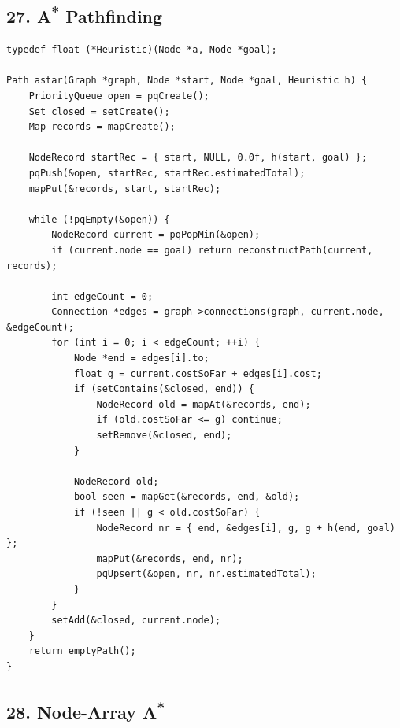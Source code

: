 \documentclass[10pt,letterpaper]{article}
\begin{document}
\subsection*{27. \texorpdfstring{A\textsuperscript{*}}{A*} Pathfinding}
{}

\begin{verbatim}
typedef float (*Heuristic)(Node *a, Node *goal);

Path astar(Graph *graph, Node *start, Node *goal, Heuristic h) {
    PriorityQueue open = pqCreate();
    Set closed = setCreate();
    Map records = mapCreate();

    NodeRecord startRec = { start, NULL, 0.0f, h(start, goal) };
    pqPush(&open, startRec, startRec.estimatedTotal);
    mapPut(&records, start, startRec);

    while (!pqEmpty(&open)) {
        NodeRecord current = pqPopMin(&open);
        if (current.node == goal) return reconstructPath(current, records);

        int edgeCount = 0;
        Connection *edges = graph->connections(graph, current.node, &edgeCount);
        for (int i = 0; i < edgeCount; ++i) {
            Node *end = edges[i].to;
            float g = current.costSoFar + edges[i].cost;
            if (setContains(&closed, end)) {
                NodeRecord old = mapAt(&records, end);
                if (old.costSoFar <= g) continue;
                setRemove(&closed, end);
            }

            NodeRecord old;
            bool seen = mapGet(&records, end, &old);
            if (!seen || g < old.costSoFar) {
                NodeRecord nr = { end, &edges[i], g, g + h(end, goal) };
                mapPut(&records, end, nr);
                pqUpsert(&open, nr, nr.estimatedTotal);
            }
        }
        setAdd(&closed, current.node);
    }
    return emptyPath();
}
\end{verbatim}

\subsection*{28. Node-Array \texorpdfstring{A\textsuperscript{*}}{A*}}
{}
\end{document}
